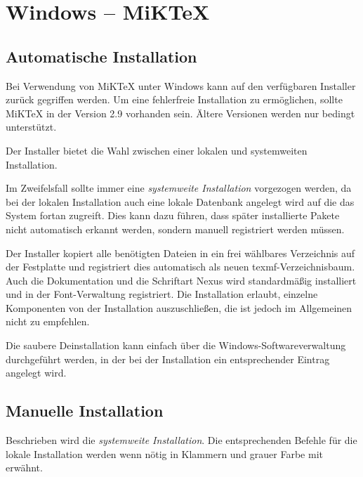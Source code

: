 \clearpage
\section{Windows -- MiKTeX}

\subsection{Automatische Installation}

Bei Verwendung von MiKTeX unter Windows kann auf den verfügbaren Installer
zurück gegriffen werden. Um eine fehlerfreie Installation zu ermöglichen,
sollte MiKTeX in der Version 2.9 vorhanden sein.
Ältere Versionen werden nur bedingt unterstützt.

Der Installer bietet die Wahl zwischen einer lokalen und systemweiten
Installation.
\begin{important}
Im Zweifelsfall sollte immer eine \emph{systemweite Installation}
vorgezogen werden, da bei der lokalen Installation auch eine lokale
Datenbank angelegt wird auf die das System fortan zugreift.
Dies kann dazu führen, dass später installierte Pakete nicht automatisch
erkannt werden, sondern manuell registriert werden müssen.
\end{important}

Der Installer kopiert alle benötigten Dateien in ein frei wählbares Verzeichnis
auf der Festplatte und registriert dies automatisch als neuen texmf-Verzeichnisbaum.
Auch die Dokumentation und die Schriftart Nexus wird standardmäßig installiert
und in der Font-Verwaltung registriert.
Die Installation erlaubt, einzelne Komponenten von der Installation auszuschließen,
die ist jedoch im Allgemeinen nicht zu empfehlen.\par

Die saubere Deinstallation kann einfach über die Windows-Softwareverwaltung 
durchgeführt werden, in der bei der Installation ein entsprechender Eintrag
angelegt wird.

\newcommand\localinstall[1]{%
  {\leavevmode\color{tuGray80}(#1)}%
}

\subsection{Manuelle Installation} %

Beschrieben wird die \emph{systemweite Installation}.
Die entsprechenden Befehle für die lokale Installation werden wenn nötig
in Klammern und grauer Farbe mit erwähnt.

